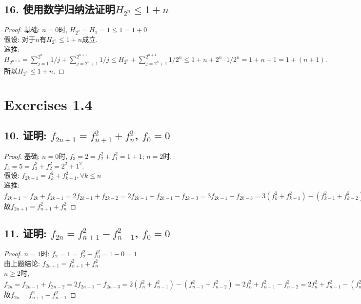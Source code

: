 \documentclass[UTF8, onecolumn, a4paper]{article}
\begin{document}
\subsection*{16. 使用数学归纳法证明$H_{2^n} \leq 1 + n$}
\begin{proof}
基础: $n= 0$时, $H_{2^0} = H_1 = 1 \leq 1 = 1 + 0$\\
假设: 对于$n$有$H_{2^n} \leq 1 + n$成立.\\
递推: $H_{2^{n+1}} = \sum_{j=1}^{2^n}1/j + \sum_{j=2^n+1}^{2^{n+1}}1/j \leq H_{2^n} + \sum_{j=2^n+1}^{2^{n+1}}1/2^n\leq 1 + n + 2^n\cdot 1/2^n = 1 + n + 1 = 1 + (n+1).$\\
所以$H_{2^n} \leq 1 + n$.
\end{proof}
\section*{Exercises 1.4}
\subsection*{10. 证明: $f_{2n+1} = f_{n+1}^2 + f_{n}^2$, $f_0 = 0$}
\begin{proof}
基础: $n=0$时, $f_3 = 2 = f_2^2 + f_1^2 = 1 + 1$; $n=2$时, $f_5 = 5 = f_3^2 + f_2^2 = 2^2 + 1^2$.\\
假设: $f_{2k-1} = f_{k}^2 + f_{k-1}^2, \forall k \leq n$\\
递推: $f_{2k+1} = f_{2k} + f_{2k-1} = 2f_{2k-1} + f_{2k-2} = 2f_{2k-1} + f_{2k-1} - f_{2k-3} = 3f_{2k-1} - f_{2k-3} = 3(f_k^2 + f_{k-1}^2) - (f_{k-1}^2 + f_{k-2}^2) = 3f_k^2 + 2f_{k-1}^2 - (f_k - f_{k-1})^2 = 2f_k^2 + f_{k-1}^2 + 2f_kf_{k-1} = 2f_k^2 + (f_{k+1} - f_k)^2 + 2f_k(f_{k+1} - f_k) = f_{k+1}^2 + f_k^2$\\
故$f_{2n+1} = f_{n+1}^2 + f_{n}^2$
\end{proof} 
\subsection*{11. 证明: $f_{2n} = f_{n+1}^2 - f_{n-1}^2$, $f_0 = 0$}
\begin{proof}
$n = 1$时: $f_2 = 1 = f_2^2 - f_0^2 = 1 - 0 = 1$\\
由上题结论: $f_{2n+1} = f_{n+1}^2 + f_{n}^2$\\
$n\geq 2$时, $f_{2n} = f_{2n-1} + f_{2n-2} = 2f_{2n-1} - f_{2n-3} = 2(f_{n}^2 + f_{n-1}^2) - (f_{n-1}^2 + f_{n-2}^2) = 2f_n^2 + f_{n-1}^2 - f_{n-2}^2 = 2f_n^2 + f_{n-1}^2 - (f_n^2 - f_{n-1})^2 =f_n^2 + 2f_n f_{n-1}= (f_{n+1} - f_{n-1})^2 + 2(f_{n+1} - f_{n-1})f_{n-1} = f_{n+1}^2 - f_{n-1}^2$\\
故$f_{2n} = f_{n+1}^2 - f_{n-1}^2$
\end{proof}
\end{document}
